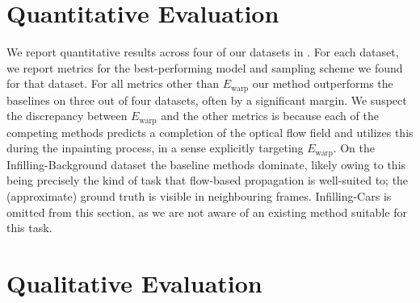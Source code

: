 \section{Quantitative Evaluation}
We report quantitative results across four of our datasets in . For each dataset, we report metrics for the best-performing model and sampling scheme we found for that dataset. For all metrics other than $E_\text{warp}$ our method outperforms the baselines on three out of four datasets, often by a significant margin. We suspect the discrepancy between $E_\text{warp}$ and the other metrics is because each of the competing methods predicts a completion of the optical flow field and utilizes this during the inpainting process, in a sense explicitly targeting $E_\text{warp}$. On the Infilling-Background dataset the baseline methods dominate, likely owing to this being precisely the kind of task that flow-based propagation is well-suited to; the (approximate) ground truth is visible in neighbouring frames. Infilling-Cars is omitted from this section, as we are not aware of an existing method suitable for this task. 


\section{Qualitative Evaluation}
